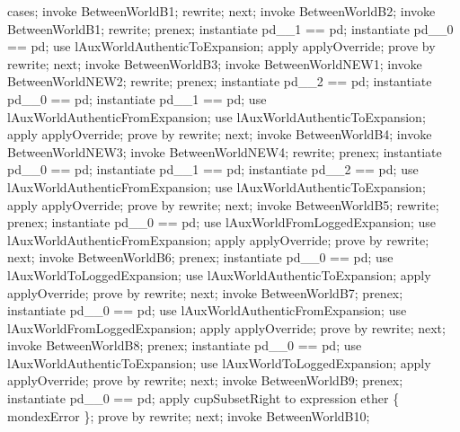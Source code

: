 \begin{LPScript}
\begin{zproof}[lPromotedBetweenWorldAbortType]
        cases;
            invoke BetweenWorldB1;
            rewrite;
        next;
            invoke BetweenWorldB2;
            invoke BetweenWorldB1;
            rewrite;
            prenex;
            instantiate pd\_\_1 == pd;
            instantiate pd\_\_0 == pd;
            use lAuxWorldAuthenticToExpansion;
            apply applyOverride;
            prove by rewrite;
        next;
            invoke BetweenWorldB3;
            invoke BetweenWorldNEW1;
            invoke BetweenWorldNEW2;
            rewrite;
            prenex;
            instantiate pd\_\_2 == pd;
            instantiate pd\_\_0 == pd;
            instantiate pd\_\_1 == pd;
            use lAuxWorldAuthenticFromExpansion;
            use lAuxWorldAuthenticToExpansion;
            apply applyOverride;
            prove by rewrite;
        next;
            invoke BetweenWorldB4;
            invoke BetweenWorldNEW3;
            invoke BetweenWorldNEW4;
            rewrite;
            prenex;
            instantiate pd\_\_0 == pd;
            instantiate pd\_\_1 == pd;
            instantiate pd\_\_2 == pd;
            use lAuxWorldAuthenticFromExpansion;
            use lAuxWorldAuthenticToExpansion;
            apply applyOverride;
            prove by rewrite;
        next;
            invoke BetweenWorldB5;
            rewrite;
            prenex;
            instantiate pd\_\_0 == pd;
            use lAuxWorldFromLoggedExpansion;
            use lAuxWorldAuthenticFromExpansion;
            apply applyOverride;
            prove by rewrite;
        next;
            invoke BetweenWorldB6;
            prenex;
            instantiate pd\_\_0 == pd;
            use lAuxWorldToLoggedExpansion;
            use lAuxWorldAuthenticToExpansion;
            apply applyOverride;
            prove by rewrite;
        next;
            invoke BetweenWorldB7;
            prenex;
            instantiate pd\_\_0 == pd;
            use lAuxWorldAuthenticFromExpansion;
            use lAuxWorldFromLoggedExpansion;
            apply applyOverride;
            prove by rewrite;
        next;
            invoke BetweenWorldB8;
            prenex;
            instantiate pd\_\_0 == pd;
            use lAuxWorldAuthenticToExpansion;
            use lAuxWorldToLoggedExpansion;
            apply applyOverride;
            prove by rewrite;
        next;
            invoke BetweenWorldB9;
            prenex;
            instantiate pd\_\_0 == pd;
            apply cupSubsetRight to expression ether \cup \{ mondexError \};
            prove by rewrite;
        next;
            invoke BetweenWorldB10;

\end{zproof}
\end{LPScript}
